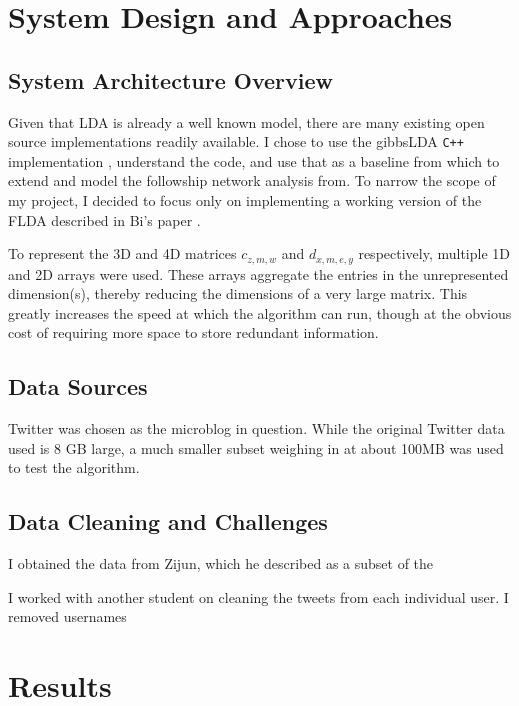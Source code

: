 \documentclass[a4paper]{article}
\begin{document}
\section{System Design and Approaches}
\label{sec:approach}
\subsection{System Architecture Overview}
Given that LDA is already a well known model, there are many existing open source implementations readily available. I chose to use the gibbsLDA \verb!C++! implementation \cite{gibbs_lda}, understand the code, and use that as a baseline from which to extend and model the followship network analysis from. To narrow the scope of my project, I decided to focus only on implementing a working version of the FLDA described in Bi's paper \cite{flda}.

To represent the 3D and 4D matrices $c_{z, m, w}$ and $d_{x, m, e, y}$ respectively, multiple 1D and 2D arrays were used. These arrays aggregate the entries in the unrepresented dimension(s), thereby reducing the dimensions of a very large matrix. This greatly increases the speed at which the algorithm can run, though at the obvious cost of requiring more space to store redundant information.

\subsection{Data Sources}
Twitter was chosen as the microblog in question. While the original Twitter data used is 8 GB large, a much smaller subset weighing in at about 100MB was used to test the algorithm.

\subsection{Data Cleaning and Challenges}
I obtained the data from Zijun, which he described as a subset of the 

I worked with another student on cleaning the tweets from each individual user. I removed usernames 


\section{Results}
\label{sec:results}
\end{document}
